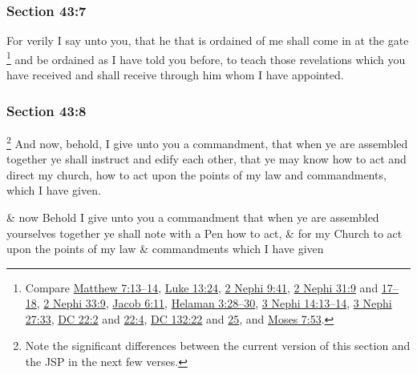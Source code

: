 	\subsubsection{Section 43:7} %
		\label{DC43-7}

		For verily I say unto you, that he that is ordained of me shall come in at the gate%
			\footnote{%
				Compare \hyperref[MATTHEW-7-13]{Matthew 7:13--14}, \hyperref[LUKE-13-24]{Luke 13:24}, \hyperref[2NEPHI-9-41]{2 Nephi 9:41}, \hyperref[2NEPHI-31-9]{2 Nephi 31:9} and \hyperref[2NEPHI-31-17]{17--18}, \hyperref[2NEPHI-33-9]{2 Nephi 33:9}, \hyperref[JACOB-6-11]{Jacob 6:11}, \hyperref[HELAMAN-3-28]{Helaman 3:28--30}, \hyperref[3NEPHI-14-13]{3 Nephi 14:13--14}, \hyperref[3NEPHI-27-33]{3 Nephi 27:33}, \hyperref[DC22-2]{DC 22:2} and \hyperref[DC22-4]{22:4}, \hyperref[DC132-22]{DC 132:22} and \hyperref[DC132-25]{25}, and \hyperref[MOSES-7-53]{Moses 7:53}.
				}
		and be ordained as I have told you before, to teach those revelations which you have received and shall receive through him whom I have appointed.


	\subsubsection{Section 43:8} %
		\label{DC43-8}

			\footnote{%
				Note the significant differences between the current version of this section and the JSP in the next few verses.
				}%
		And now, behold, I give unto you a commandment, that when ye are assembled together ye shall instruct and edify each other, that ye may know how to act and direct my church, how to act upon the points of my law and commandments, which I have given.

		\begin{framed}
		\scriptsize
			\begin{compactdesc}
				\item[JSP] \& now Behold I give unto you a commandment that when ye are assembled yourselves together ye shall note with a Pen how to act, \& for my Church to act upon the points of my law \& commandments which I have given
			\end{compactdesc}
		\end{framed}

